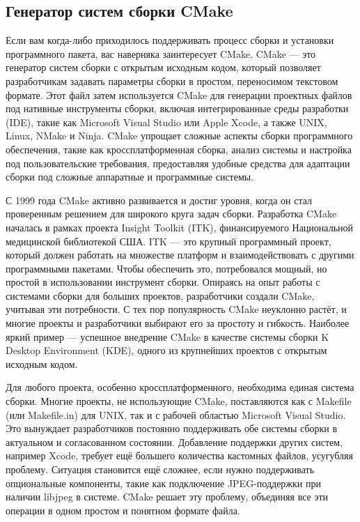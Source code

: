 \subsection{Генератор систем сборки CMake}

Если вам когда-либо приходилось поддерживать процесс сборки и установки программного пакета, вас наверняка заинтересует CMake. CMake — это генератор систем сборки с открытым исходным кодом, который позволяет разработчикам задавать параметры сборки в простом, переносимом текстовом формате. Этот файл затем используется CMake для генерации проектных файлов под нативные инструменты сборки, включая интегрированные среды разработки (IDE), такие как Microsoft Visual Studio или Apple Xcode, а также UNIX, Linux, NMake и Ninja. CMake упрощает сложные аспекты сборки программного обеспечения, такие как кроссплатформенная сборка, анализ системы и настройка под пользовательские требования, предоставляя удобные средства для адаптации сборки под сложные аппаратные и программные системы.

С 1999 года CMake активно развивается и достиг уровня, когда он стал проверенным решением для широкого круга задач сборки. Разработка CMake началась в рамках проекта Insight Toolkit (ITK), финансируемого Национальной медицинской библиотекой США. ITK — это крупный программный проект, который должен работать на множестве платформ и взаимодействовать с другими программными пакетами. Чтобы обеспечить это, потребовался мощный, но простой в использовании инструмент сборки. Опираясь на опыт работы с системами сборки для больших проектов, разработчики создали CMake, учитывая эти потребности. С тех пор популярность CMake неуклонно растёт, и многие проекты и разработчики выбирают его за простоту и гибкость. Наиболее яркий пример — успешное внедрение CMake в качестве системы сборки K Desktop Environment (KDE), одного из крупнейших проектов с открытым исходным кодом.

Для любого проекта, особенно кроссплатформенного, необходима единая система сборки. Многие проекты, не использующие CMake, поставляются как с Makefile (или Makefile.in) для UNIX, так и с рабочей областью Microsoft Visual Studio. Это вынуждает разработчиков постоянно поддерживать обе системы сборки в актуальном и согласованном состоянии. Добавление поддержки других систем, например Xcode, требует ещё большего количества кастомных файлов, усугубляя проблему. Ситуация становится ещё сложнее, если нужно поддерживать опциональные компоненты, такие как подключение JPEG-поддержки при наличии libjpeg в системе. CMake решает эту проблему, объединяя все эти операции в одном простом и понятном формате файла.

